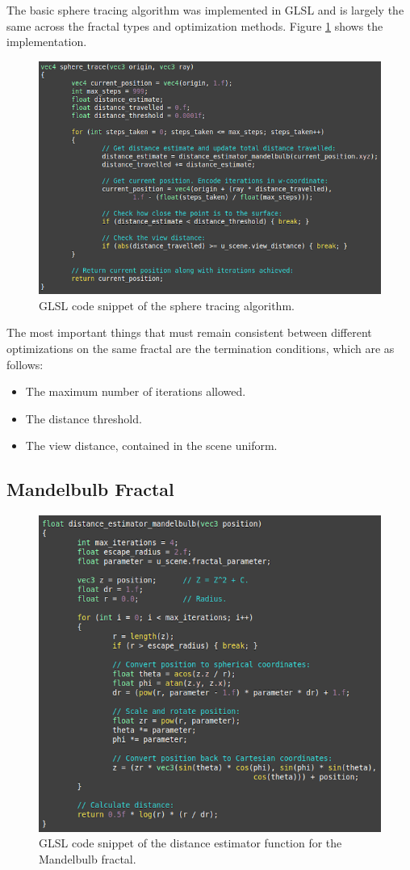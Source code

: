 The basic sphere tracing algorithm was implemented in GLSL and is largely the same across the fractal types and optimization methods. Figure \ref{figure:glsl-sphere-tracing} shows the implementation.

\begin{figure}[ht]
	\centering
	\includegraphics[width=0.65\linewidth, frame]{Images/GLSL-Sphere-Tracing.png}
	\caption{GLSL code snippet of the sphere tracing algorithm.}
	\label{figure:glsl-sphere-tracing}
\end{figure}

The most important things that must remain consistent between different optimizations on the same fractal are the termination conditions, which are as follows:

\begin{itemize}
	\item The maximum number of iterations allowed.
	\item The distance threshold.
	\item The view distance, contained in the scene uniform.
\end{itemize}

\subsection{Mandelbulb Fractal}

\begin{figure}[ht]
	\centering
	\includegraphics[width=0.65\linewidth, frame]{Images/GLSL-Distance-Estimator-Mandelbulb.png}
	\caption{GLSL code snippet of the distance estimator function for the Mandelbulb fractal.}
	\label{figure:glsl-distance-estimator-mandelbulb}
\end{figure}

